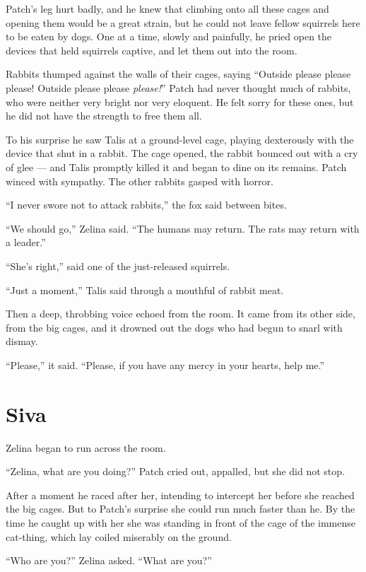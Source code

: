 \documentclass[12pt]{memoir}
\begin{document}
Patch’s leg hurt badly, and he knew that climbing onto all these cages
and opening them would be a great strain, but he could not leave
fellow squirrels here to be eaten by dogs. One at a time, slowly and
painfully, he pried open the devices that held squirrels captive, and
let them out into the room.

Rabbits thumped against the walls of their cages, saying “Outside
please please please! Outside please please \textit{please!}” Patch
had never thought much of rabbits, who were neither very bright nor
very eloquent. He felt sorry for these ones, but he did not have the
strength to free them all.

To his surprise he saw Talis at a ground-level cage, playing
dexterously with the device that shut in a rabbit. The cage opened,
the rabbit bounced out with a cry of glee — and Talis promptly killed
it and began to dine on its remains. Patch winced with sympathy. The
other rabbits gasped with horror.

“I never swore not to attack rabbits,” the fox said between bites.

“We should go,” Zelina said. “The humans may return. The rats may
return with a leader.”

“She’s right,” said one of the just-released squirrels.

“Just a moment,” Talis said through a mouthful of rabbit meat.

Then a deep, throbbing voice echoed from the room. It came from its
other side, from the big cages, and it drowned out the dogs who had
begun to snarl with dismay.

“Please,” it said. “Please, if you have any mercy in your hearts, help
me.”


\section{Siva}

Zelina began to run across the room.

“Zelina, what are you doing?” Patch cried out, appalled, but she did
not stop.

After a moment he raced after her, intending to intercept her before
she reached the big cages. But to Patch’s surprise she could run much
faster than he. By the time he caught up with her she was standing in
front of the cage of the immense cat-thing, which lay coiled miserably
on the ground.

“Who are you?” Zelina asked. “What are you?”
\end{document}
